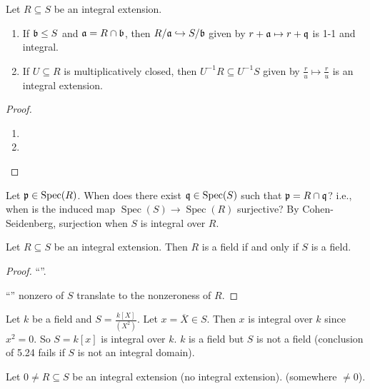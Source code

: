 \begin{proposition}
    Let $R \subseteq S$ be an integral extension.
    \begin{enumerate}
        \item If $\mathfrak{b} \leq S$ and $\mathfrak{a} = R \cap \mathfrak{b}$, then $R/\mathfrak{a} \hookrightarrow S/\mathfrak{b}$ given by $r+\mathfrak{a} \mapsto r+\mathfrak{q}$ is 1-1 and integral. 
        \item If $U \subseteq R$ is multiplicatively closed, then $U^{-1}R \subseteq U^{-1}S$ given by $\frac{r}{u} \mapsto \frac{r}{u}$ is an integral extension.
    \end{enumerate}
\end{proposition}

\begin{proof}
    \begin{enumerate}
        \item 
        \item 
    \end{enumerate}
\end{proof}

\begin{discussion}
    Let $\mathfrak{p} \in \operatorname{Spec}(R)$. When does there exist $\mathfrak{q} \in \operatorname{Spec}(S)$ such that $\mathfrak{p} = R \cap \mathfrak{q}$? i.e., when is the induced map $\operatorname{Spec}(S) \to \operatorname{Spec}(R)$ surjective? By Cohen-Seidenberg, surjection when $S$ is integral over $R$.
\end{discussion}

\begin{proposition}
    Let $R \subseteq S$ be an integral extension. Then $R$ is a field if and only if $S$ is a field.
\end{proposition}

\begin{proof}
    ``''. \par 
    ``'' nonzero of $S$ translate to the nonzeroness of $R$.
\end{proof}

\begin{example}
    Let $k$ be a field and $S = \frac{k[X]}{(X^{2})}$. Let $x = \overbar{X} \in S$. Then $x$ is integral over $k$ since $x^{2} = 0$. So $S = k[x]$ is integral over $k$. $k$ is a field but $S$ is not a field (conclusion of 5.24 fails if $S$ is not an integral domain).
\end{example}

\noindent Let $0 \neq R \subseteq S$ be an integral extension (no integral extension). (somewhere $\neq 0$).

